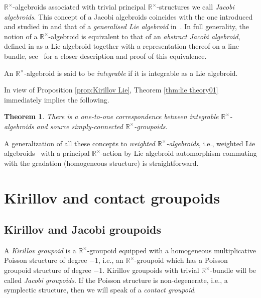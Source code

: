 \documentclass[10pt,a4paper]{amsart}
\newcommand{\R}{{\mathbb R}}
\newcommand{\ti}{\times}
\def\Rt{{\R^\times}}
\numberwithin{equation}{section}
\newtheorem{Theorem}{Theorem}[section]
\begin{document}
\begin{Remark}
$\Rt$-algebroids associated with trivial principal $\Rt$-structures we call \emph{Jacobi algebroids}. This concept of a Jacobi algebroids coincides with the one introduced and studied in \cite{Grabowski:2001,Grabowski:2003} and that of a \emph{generalised Lie algebroid} in~\cite{Iglesias-Ponte:2001}. In full generality, the notion of a $\Rt$-algebroid is equivalent to that of an \emph{abstract Jacobi algebroid}, def\/ined in \cite{Le:2014} as a Lie algebroid together with a representation thereof on a line bundle, see~\cite{Grabowski2013} for a closer description and proof of this equivalence.
\end{Remark}

\begin{Definition}
An $\Rt$-algebroid is said to be \emph{integrable} if it is integrable as a Lie algebroid.
\end{Definition}

In view of Proposition \ref{prop:Kirillov Lie}, Theorem \ref{thm:lie theory01} immediately implies the following.
\begin{Theorem}\label{thm:lie theory1} There is a one-to-one correspondence between integrable $\Rt$-algebroids and source simply-connected $\mathbb{R}^{\times}$-groupoids.
\end{Theorem}

A generalization of all these concepts to \emph{weighted $\Rt$-algebroids}, i.e., weighted Lie algebroids~\cite{Bruce:2014} with a principal $\Rt$-action by Lie algebroid automorphism commuting with the gradation (homogeneous structure) is straightforward.

\section{Kirillov and contact groupoids}\label{sec:contact and jacobi}
\subsection{Kirillov and Jacobi groupoids}
\begin{Definition}A \emph{Kirillov groupoid} is a $\mathbb{R}^{\times}$-groupoid equipped with a homogeneous multiplicative Poisson structure of degree $-1$, i.e., an $\Rt$-groupoid which has a Poisson groupoid structure of degree $-1$. Kirillov groupoids with trivial $\R^\ti$-bundle will be called \emph{Jacobi groupoids}. If the Poisson structure is non-degenerate, i.e., a symplectic structure, then we will speak of a \emph{contact groupoid}.
\end{Definition}
\end{document}
